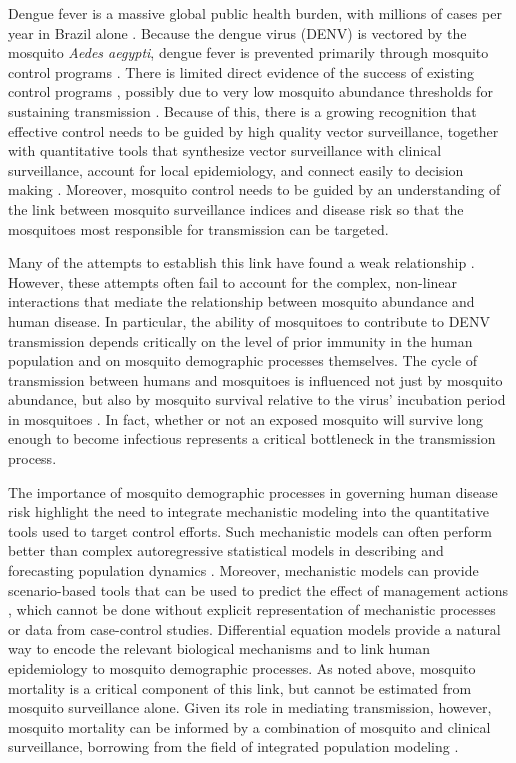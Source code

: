 \documentclass[10pt,letterpaper]{article}
\begin{document}
Dengue fever is a massive global public health burden, with millions of cases per year in Brazil alone \cite{Bhatt2013}.  
Because the dengue virus (DENV) is vectored by the mosquito \textit{Aedes aegypti}, dengue fever is prevented primarily through mosquito control programs \cite{Achee2015}.
There is limited direct evidence of the success of existing control programs \cite{Esu2010}, possibly due to very low mosquito abundance thresholds for sustaining transmission \cite{Scott2010a}.
Because of this, there is a growing recognition that effective control needs to be guided by high quality vector surveillance, together with quantitative tools that synthesize vector surveillance with clinical surveillance, account for local epidemiology, and connect easily to decision making \cite{Morrison2008}.
Moreover, mosquito control needs to be guided by an understanding of the link between mosquito surveillance indices and disease risk so that the mosquitoes most responsible for transmission can be targeted.

Many of the attempts to establish this link have found a weak relationship \cite{Bowman2014, Pepin2015, Cromwell2017}.
However, these attempts often fail to account for the complex, non-linear interactions that mediate the relationship between mosquito abundance and human disease.
In particular, the ability of mosquitoes to contribute to DENV transmission depends critically on the level of prior immunity in the human population \cite{Scott2010a} and on mosquito demographic processes themselves.
The cycle of transmission between humans and mosquitoes is influenced not just by mosquito abundance, but also by mosquito survival relative to the virus' incubation period in mosquitoes \cite{Achee2015}.
In fact, whether or not an exposed mosquito will survive long enough to become infectious represents a critical bottleneck in the transmission process.

The importance of mosquito demographic processes in governing human disease risk highlight the need to integrate mechanistic modeling into the quantitative tools used to target control efforts.
Such mechanistic models can often perform better than complex autoregressive statistical models in describing and forecasting population dynamics \cite{Reilly2005}.
Moreover, mechanistic models can provide scenario-based tools that can be used to predict the effect of management actions \cite{Buckland2007}, which cannot be done without explicit representation of mechanistic processes or data from case-control studies.
Differential equation models provide a natural way to encode the relevant biological mechanisms and to link human epidemiology to mosquito demographic processes.
As noted above, mosquito mortality is a critical component of this link, but cannot be estimated from mosquito surveillance alone.
Given its role in mediating transmission, however, mosquito mortality can be informed by a combination of mosquito and clinical surveillance, borrowing from the field of integrated population modeling \cite{Schaub2010}.
\end{document}
